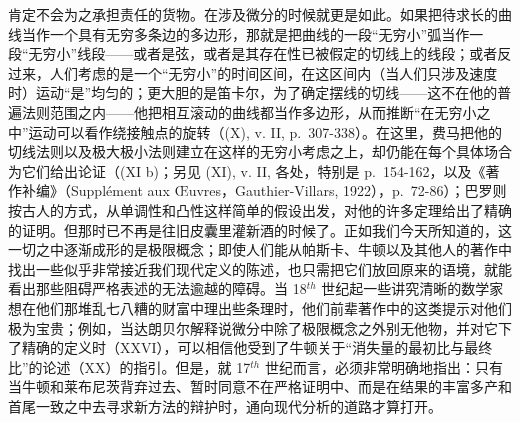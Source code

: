 肯定不会为之承担责任的货物。在涉及微分的时候就更是如此。如果把待求长的曲线当作一个具有无穷多条边的多边形，那就是把曲线的一段“无穷小”弧当作一段“无穷小”线段——或者是弦，或者是其存在性已被假定的切线上的线段；或者反过来，人们考虑的是一个“无穷小”的时间区间，在这区间内（当人们只涉及速度时）运动“是”均匀的；更大胆的是笛卡尔，为了确定摆线的切线——这不在他的普遍法则范围之内——他把相互滚动的曲线都当作多边形，从而推断“在无穷小之中”运动可以看作绕接触点的旋转（(X), v. II, p.~307-338）。在这里，费马把他的切线法则以及极大极小法则建立在这样的无穷小考虑之上，却仍能在每个具体场合为它们给出论证（(XI b)；另见 (XI), v. II, 各处，特别是 p.~154-162，以及《著作补编》（Supplément aux Œuvres，Gauthier-Villars, 1922），p.~72-86）；巴罗则按古人的方式，从单调性和凸性这样简单的假设出发，对他的许多定理给出了精确的证明。但那时已不再是往旧皮囊里灌新酒的时候了。正如我们今天所知道的，这一切之中逐渐成形的是极限概念；即使人们能从帕斯卡、牛顿以及其他人的著作中找出一些似乎非常接近我们现代定义的陈述，也只需把它们放回原来的语境，就能看出那些阻碍严格表述的无法逾越的障碍。当 18\(^{th}\) 世纪起一些讲究清晰的数学家想在他们那堆乱七八糟的财富中理出些条理时，他们前辈著作中的这类提示对他们极为宝贵；例如，当达朗贝尔解释说微分中除了极限概念之外别无他物，并对它下了精确的定义时（XXVI），可以相信他受到了牛顿关于“消失量的最初比与最终比”的论述（XX）的指引。但是，就 17\(^{th}\) 世纪而言，必须非常明确地指出：只有当牛顿和莱布尼茨背弃过去、暂时同意不在严格证明中、而是在结果的丰富多产和首尾一致之中去寻求新方法的辩护时，通向现代分析的道路才算打开。

